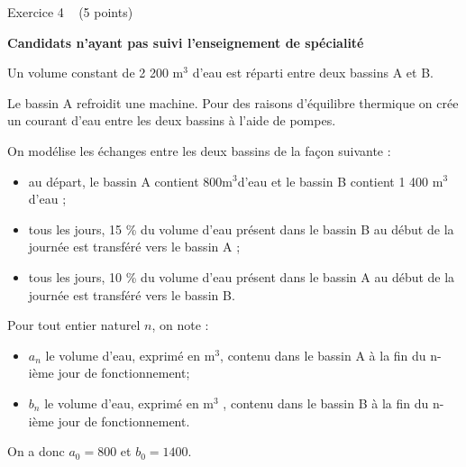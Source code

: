 
%
\begin{h2}Exercice 4   (5 points)\end{h2}
\textbf{Candidats n'ayant pas suivi l'enseignement de spécialité}
\par
Un volume constant de 2 200 $ \text{m}^{3}$ d'eau est réparti entre deux bassins A et B.
\par
Le bassin A refroidit une machine. Pour des raisons d'équilibre thermique on crée un courant d'eau entre les deux bassins à l'aide de pompes.
\par
On modélise les échanges entre les deux bassins de la façon suivante :
\begin{itemize}
     \item
     au départ, le bassin A contient 800$ \text{m}^{3}$d'eau et le bassin B contient 1 400 $ \text{m}^{3}$ d'eau ;
     \item
     tous les jours, 15 \% du volume d'eau présent dans le bassin B au début de la journée est transféré vers le bassin A ;
     \item
tous les jours, 10 \% du volume d'eau présent dans le bassin A au début de la journée est transféré vers le bassin B.\end{itemize}
Pour tout entier naturel $n$, on note :
\begin{itemize}
     \item
     $a_{n}$ le volume d'eau, exprimé en $ \text{m}^{3}$, contenu dans le bassin A à la fin du n-ième jour de fonctionnement;
     \item
     $b_{n}$ le volume d'eau, exprimé en $ \text{m}^{3}$ , contenu dans le bassin B à la fin du n-ième jour de  fonctionnement.
\end{itemize}
On a donc $a_{0} = 800$ et $b_{0} = 1 400$.
